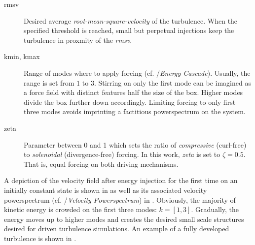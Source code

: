\begin{description}
    \item [rmsv] Desired average \emph{root-mean-square-velocity} of the turbulence. When the
            specified threshold is reached, small but perpetual injections keep the turbulence
            in proxmity of the \emph{rmsv}.
    \item [kmin, kmax] Range of modes where to apply forcing (cf.
        /\emph{Energy Cascade}). Usually, the range is set from $1$ to
        $3$. Stirring on only the first mode can be imagined as a force field with
        distinct features half the size of the box. Higher modes divide the box further
        down accordingly. Limiting forcing to only first three modes avoids imprinting
        a factitious powerspectrum on the system.
    \item [zeta] Parameter between 0 and 1 which sets the ratio of
            \emph{compressive} (curl-free) to \emph{solenoidal} (divergence-free)
            forcing. In this work, \emph{zeta} is set to $\zeta = 0.5$. That is,
            equal forcing on both driving mechanisms.

\end{description}
A depiction of the velocity field after energy injection for the first time on
an initially constant state is shown in
 as well as its associated velocity
powerspectrum (cf. /\emph{Velocity Powerspectrum}) in
.  Obviously, the majority of kinetic energy
is crowded on the first three modes: $k = [1,3]$. Gradually, the energy moves
up to higher modes and creates the desired small scale structures desired for
driven turbulence simulations. An example of a fully developed turbulence
is shown in .
